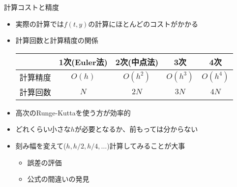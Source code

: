 \begin{frame}[t,fragile]{計算コストと精度}
  \begin{itemize}
  \item 実際の計算では$f(t,y)$の計算にほとんどのコストがかかる
  \item 計算回数と計算精度の関係
    \begin{center}
      \begin{tabular}[h]{c|cccc}
        & 1次(Euler法) & 2次(中点法) & 3次 & 4次 \\
        \hline
        計算精度 & $O(h)$ & $O(h^2)$ & $O(h^3)$ & $O(h^4)$ \\
        計算回数 & $N$ & $2N$ & $3N$ & $4N$
      \end{tabular}
    \end{center}
  \item 高次のRunge-Kuttaを使う方が効率的
  \item どれくらい小さな$h$が必要となるか、前もっては分からない
  \item 刻み幅を変えて($h,h/2,h/4,\dots$)計算してみることが大事
    \begin{itemize}
    \item 誤差の評価
    \item 公式の間違いの発見
    \end{itemize}
  \end{itemize}
\end{frame}
